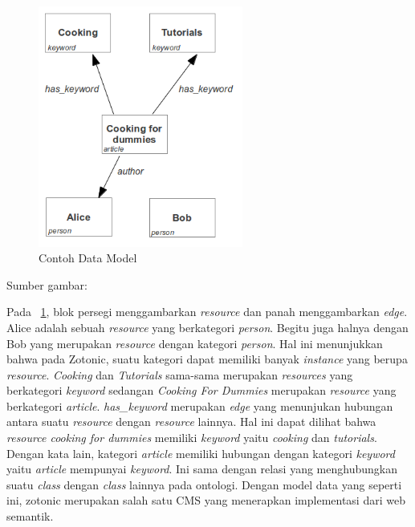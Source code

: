 \begin{figure}
	\centering
	\includegraphics[width=0.6\textwidth]
	{pics/dataModel.png}
	\caption{Contoh Data Model}
	\label{fig:dataModel}
\end{figure}
\vspace{-1cm}
\begin{center}
{\small Sumber gambar: \citep{zotonic.model}}
\end{center}

Pada \pic~\ref{fig:dataModel}, blok persegi menggambarkan \textit{resource} dan panah menggambarkan \textit{edge}. Alice adalah sebuah \textit{resource} yang berkategori \textit{person}. Begitu juga halnya dengan Bob yang merupakan \textit{resource} dengan kategori \textit{person}. Hal ini menunjukkan bahwa pada Zotonic, suatu kategori dapat memiliki banyak \textit{instance} yang berupa \textit{resource}. \textit{Cooking} dan \textit{Tutorials} sama-sama merupakan \textit{resources} yang berkategori \textit{keyword} sedangan \textit{Cooking For Dummies} merupakan \textit{resource} yang berkategori \textit{article}. \textit{has\_keyword} merupakan \textit{edge} yang menunjukan hubungan antara suatu \textit{resource} dengan \textit{resource} lainnya. Hal ini dapat dilihat bahwa \textit{resource cooking for dummies} memiliki \textit{keyword} yaitu \textit{cooking} dan \textit{tutorials}. Dengan kata lain, kategori \textit{article} memiliki hubungan dengan kategori \textit{keyword} yaitu \textit{article} mempunyai \textit{keyword}. Ini sama dengan relasi yang menghubungkan suatu \textit{class} dengan \textit{class} lainnya pada ontologi. Dengan model data yang seperti ini, zotonic merupakan salah satu CMS yang menerapkan implementasi dari web semantik.
